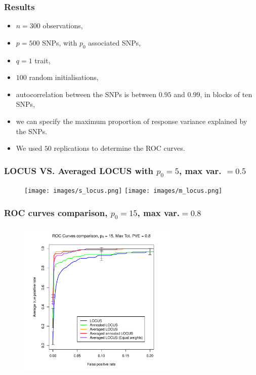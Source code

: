 \documentclass{beamer}
\begin{document}
\begin{frame}
\frametitle{Results}
\begin{itemize}
\item $n = 300$ observations,
\item $p = 500$ SNPs, with $p_0$ associated SNPs,
\item $q = 1$ trait, %
\item $100$ random initialisations,
\item autocorrelation between the SNPs is between $0.95$ and $0.99$, in blocks of ten SNPs,
\item we can specify the maximum proportion of response variance explained by the SNPs.
\item We used $50$ replications to determine the ROC curves.
\end{itemize}
\end{frame}

\begin{frame}
\frametitle{LOCUS VS. Averaged LOCUS with $p_0 = 5$, max var. $=0.5$}
\begin{figure}
\texttt{[image: images/s\_locus.png]}
\texttt{[image: images/m\_locus.png]}
\end{figure}
\end{frame}


\begin{frame}
\frametitle{ROC curves comparison, $p_0 = 15$, max var.$=0.8$}
\begin{figure}
\includegraphics[width=3in]{images/ROC_curves.pdf}
\end{figure}
\end{frame}
\end{document}
